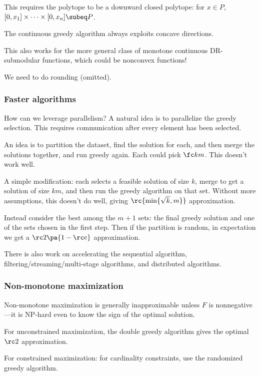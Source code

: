This requires the polytope to be a downward closed polytope: for $x\in P$, $[0,x_1]\times \cdots \times [0,x_n]\subeq P$.

The continuous greedy algorithm always exploits concave directions.

This also works for the more general class of monotone continuous DR-submodular functions, which could be nonconvex functions!

We need to do rounding (omitted).

\subsubsection{Faster algorithms}

How can we leverage parallelism? A natural idea is to parallelize the greedy selection. This requires communication after every element has been selected. 

An idea is to partition the dataset, find the solution for each, and then merge the solutions together, and run greedy again.
Each could pick $\fc km$. This doesn't work well.

A simple modification: each selects a feasible solution of size $k$, merge to get a solution of size $km$, and then run the greedy algorithm on that set.
Without more assumptions, this doesn't do well, giving $\rc{\min\{\sqrt k,m\}}$ approximation.

Instead consider the best among the $m+1$ sets: the final greedy solution and one of the sets chosen in the first step. Then if the partition is random,  in expectation we get a $\rc 2\pa{1-\rc e}$ approximation.

There is also work on accelerating the sequential algorithm, filtering/streaming/multi-stage algorithms, and distributed algorithms.

\subsubsection{Non-monotone maximization}

Non-monotone maximization is generally inapproximable unless $F$ is nonnegative---it is NP-hard even to know  the sign of the optimal solution.

For unconstrained maximization, %
the double greedy algorithm gives the optimal $\rc2$ approximation.

For constrained maximization: for cardinality constraints, use the randomized greedy algorithm.  %


